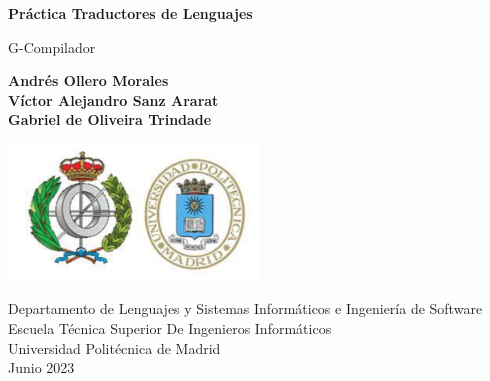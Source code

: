 \begin{titlepage}
   \begin{center}
       \vspace*{1cm}

       \textbf{Práctica Traductores de Lenguajes}

       \vspace{0.5cm}
        G-Compilador
        
       \vspace{1.5cm}

        \textbf{Andrés Ollero Morales}\\
        \textbf{Víctor Alejandro Sanz Ararat}\\
        \textbf{Gabriel de Oliveira Trindade}\\

       \vfill
            
       \vspace{0.5cm}
     
       \includegraphics[width=0.5\textwidth]{fiupm.png}

        \vfill
            
       \vspace{0.1cm}
       Departamento de Lenguajes y Sistemas Informáticos e Ingeniería de Software\\
       Escuela Técnica Superior De Ingenieros Informáticos\\
       Universidad Politécnica de Madrid\\
       Junio 2023
            
   \end{center}
\end{titlepage}